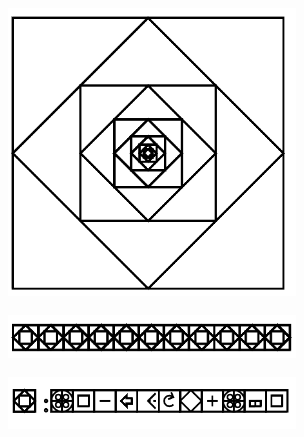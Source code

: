 \documentclass[11pt]{article}
\begin{document}
\includegraphics[width=3in]{image40.png}

\includegraphics[width=3in]{image41.png}

\includegraphics[width=3in]{image42.png}
\end{document}
